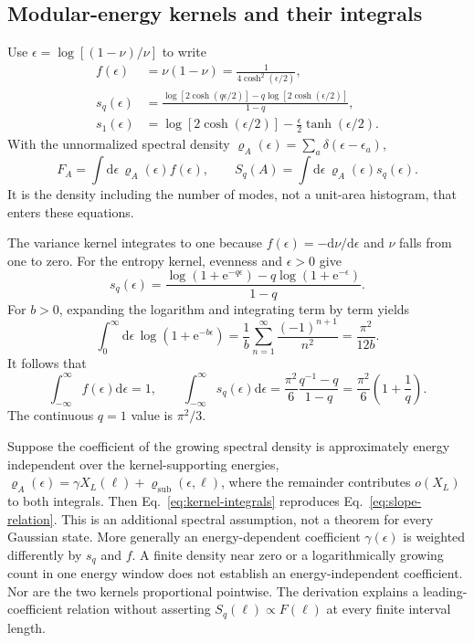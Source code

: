 \documentclass[aps,prb,onecolumn,nofootinbib,superscriptaddress]{revtex4-2}
\newcommand{\dd}{\mathrm{d}}
\newcommand{\e}{\mathrm{e}}
\begin{document}
\subsection{Modular-energy kernels and their integrals}
Use $\epsilon=\log[(1-\nu)/\nu]$ to write
\begin{align}
 f(\epsilon)&=\nu(1-\nu)=\frac{1}{4\cosh^2(\epsilon/2)},\\
 s_q(\epsilon)&=
 \frac{\log[2\cosh(q\epsilon/2)]
                -q\log[2\cosh(\epsilon/2)]}{1-q},\\
 s_1(\epsilon)&=\log[2\cosh(\epsilon/2)]
                   -\frac{\epsilon}{2}\tanh(\epsilon/2).
 \label{eq:kernels}
\end{align}
With the unnormalized spectral density
$\varrho_A(\epsilon)=\sum_a\delta(\epsilon-\epsilon_a)$,
\begin{equation}
 F_A=\int\dd\epsilon\,\varrho_A(\epsilon)f(\epsilon),\qquad
 S_q(A)=\int\dd\epsilon\,\varrho_A(\epsilon)s_q(\epsilon).
 \label{eq:kernel-observables}
\end{equation}
It is the density including the number of modes, not a unit-area histogram,
that enters these equations.

The variance kernel integrates to one because
$f(\epsilon)=-\dd\nu/\dd\epsilon$ and $\nu$ falls from one to zero.
For the entropy kernel, evenness and $\epsilon>0$ give
\begin{equation}
 s_q(\epsilon)=
 \frac{\log(1+\e^{-q\epsilon})-q\log(1+\e^{-\epsilon})}{1-q}.
\end{equation}
For $b>0$, expanding the logarithm and integrating term by term yields
\begin{equation}
 \int_0^\infty\dd\epsilon\,\log(1+\e^{-b\epsilon})
 =\frac1b\sum_{n=1}^\infty\frac{(-1)^{n+1}}{n^2}
 =\frac{\pi^2}{12b}.
\end{equation}
It follows that
\begin{equation}
 \int_{-\infty}^\infty f(\epsilon)\dd\epsilon=1,\qquad
 \int_{-\infty}^\infty s_q(\epsilon)\dd\epsilon
 =\frac{\pi^2}{6}\frac{q^{-1}-q}{1-q}
 =\frac{\pi^2}{6}\left(1+\frac1q\right).
 \label{eq:kernel-integrals}
\end{equation}
The continuous $q=1$ value is $\pi^2/3$.

Suppose the coefficient of the growing spectral density is approximately
energy independent over the kernel-supporting energies,
$\varrho_A(\epsilon)=\gamma X_L(\ell)+\varrho_{\mathrm{sub}}(\epsilon,\ell)$,
where the remainder contributes $o(X_L)$ to both integrals. Then
Eq.~\eqref{eq:kernel-integrals} reproduces Eq.~\eqref{eq:slope-relation}.
This is an additional spectral assumption, not a theorem for every
Gaussian state. More generally an energy-dependent coefficient
$\gamma(\epsilon)$ is weighted differently by $s_q$ and $f$.
A finite density near zero or a logarithmically growing count in one
energy window does not establish an energy-independent coefficient.
Nor are the two kernels proportional pointwise. The derivation explains
a leading-coefficient relation without asserting $S_q(\ell)\propto F(\ell)$
at every finite interval length.
\end{document}
